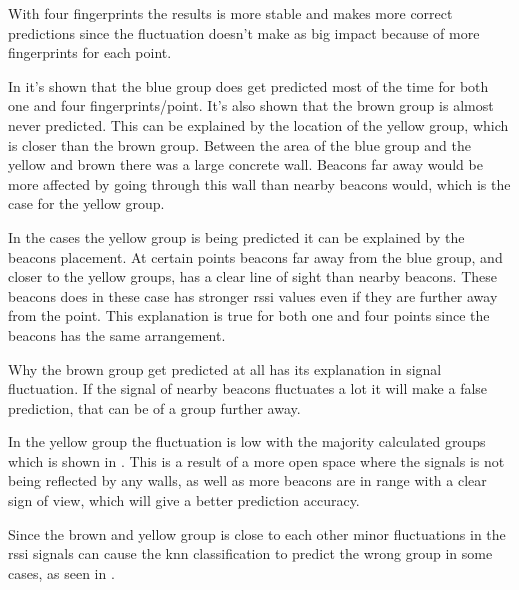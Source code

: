 \bigskip

With four fingerprints the results is more stable and makes more correct predictions since the fluctuation doesn't make as big impact because of more fingerprints for each point.


In  it's shown that the blue group does get predicted most of the time for both one and four fingerprints/point.
It's also shown that the brown group is almost never predicted.
This can be explained by the location of the yellow group, which is closer than the brown group.
Between the area of the blue group and the yellow and brown there was a large concrete wall.
Beacons far away would be more affected by going through this wall than nearby beacons would, which is the case for the yellow group.

\bigskip

In the cases the yellow group is being predicted it can be explained by the beacons placement.
At certain points beacons far away from the blue group, and closer to the yellow groups, has a clear line of sight than nearby beacons.
These beacons does in these case has stronger \acrshort{rssi} values even if they are further away from the point.
This explanation is true for both one and four points since the beacons has the same arrangement.

\bigskip

Why the brown group get predicted at all has its explanation in signal fluctuation.
If the signal of nearby beacons fluctuates a lot it will make a false prediction, that can be of a group further away.


In the yellow group the fluctuation is low with the majority calculated groups which is shown in .
This is a result of a more open space where the signals is not being reflected by any walls, as well as more beacons are in range with a clear sign of view, which will give a better prediction accuracy.

\bigskip

Since the brown and yellow group is close to each other minor fluctuations in the \acrshort{rssi} signals can cause the \acrshort{knn} classification to predict the wrong group in some cases, as seen in .

